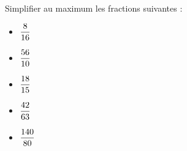 \documentclass{automatisme}
\begin{document}
\begin{frame}
	Simplifier au maximum les fractions suivantes :
	\begin{itemize}
		\setlength\itemsep{1em}
		\item $\dfrac{8}{16} \correction{= \dfrac{1}{2}}$
		\item $\dfrac{56}{10} \correction{= \dfrac{28}{5}}$
		\item $\dfrac{18}{15} \correction{= \dfrac{6}{5}}$
		\item $\dfrac{42}{63} \correction{= \dfrac{2}{3}}$
		\item $\dfrac{140}{80} \correction{= \dfrac{7}{4}}$
	\end{itemize}
\end{frame}
\end{document}
